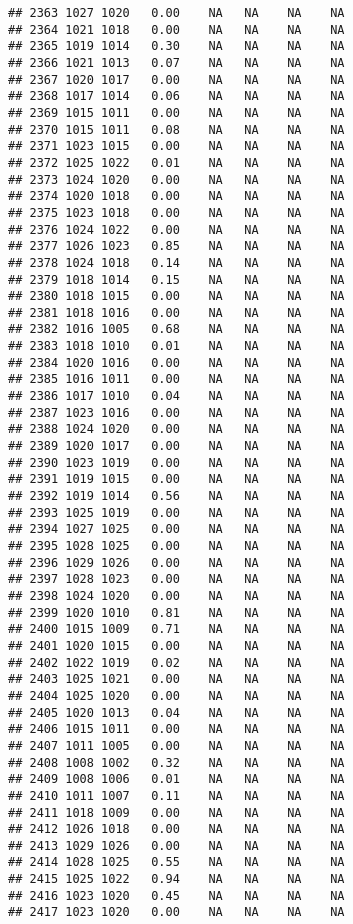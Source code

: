 \documentclass{article}\usepackage{graphicx, color}
\makeatletter
\newenvironment{kframe}{%
 \def\at@end@of@kframe{}%
 \ifinner\ifhmode%
  \def\at@end@of@kframe{\end{minipage}}%
  \begin{minipage}{\columnwidth}%
 \fi\fi%
 \def\FrameCommand##1{\hskip\@totalleftmargin \hskip-\fboxsep
 \colorbox{shadecolor}{##1}\hskip-\fboxsep
     \hskip-\linewidth \hskip-\@totalleftmargin \hskip\columnwidth}%
 \MakeFramed {\advance\hsize-\width
   \@totalleftmargin\z@ \linewidth\hsize
   \@setminipage}}%
 {\par\unskip\endMakeFramed%
 \at@end@of@kframe}
\newenvironment{knitrout}{}{} %
\makeatother
\begin{document}
\begin{knitrout}
\begin{kframe}
\begin{verbatim}
## 2363 1027 1020   0.00    NA   NA    NA    NA
## 2364 1021 1018   0.00    NA   NA    NA    NA
## 2365 1019 1014   0.30    NA   NA    NA    NA
## 2366 1021 1013   0.07    NA   NA    NA    NA
## 2367 1020 1017   0.00    NA   NA    NA    NA
## 2368 1017 1014   0.06    NA   NA    NA    NA
## 2369 1015 1011   0.00    NA   NA    NA    NA
## 2370 1015 1011   0.08    NA   NA    NA    NA
## 2371 1023 1015   0.00    NA   NA    NA    NA
## 2372 1025 1022   0.01    NA   NA    NA    NA
## 2373 1024 1020   0.00    NA   NA    NA    NA
## 2374 1020 1018   0.00    NA   NA    NA    NA
## 2375 1023 1018   0.00    NA   NA    NA    NA
## 2376 1024 1022   0.00    NA   NA    NA    NA
## 2377 1026 1023   0.85    NA   NA    NA    NA
## 2378 1024 1018   0.14    NA   NA    NA    NA
## 2379 1018 1014   0.15    NA   NA    NA    NA
## 2380 1018 1015   0.00    NA   NA    NA    NA
## 2381 1018 1016   0.00    NA   NA    NA    NA
## 2382 1016 1005   0.68    NA   NA    NA    NA
## 2383 1018 1010   0.01    NA   NA    NA    NA
## 2384 1020 1016   0.00    NA   NA    NA    NA
## 2385 1016 1011   0.00    NA   NA    NA    NA
## 2386 1017 1010   0.04    NA   NA    NA    NA
## 2387 1023 1016   0.00    NA   NA    NA    NA
## 2388 1024 1020   0.00    NA   NA    NA    NA
## 2389 1020 1017   0.00    NA   NA    NA    NA
## 2390 1023 1019   0.00    NA   NA    NA    NA
## 2391 1019 1015   0.00    NA   NA    NA    NA
## 2392 1019 1014   0.56    NA   NA    NA    NA
## 2393 1025 1019   0.00    NA   NA    NA    NA
## 2394 1027 1025   0.00    NA   NA    NA    NA
## 2395 1028 1025   0.00    NA   NA    NA    NA
## 2396 1029 1026   0.00    NA   NA    NA    NA
## 2397 1028 1023   0.00    NA   NA    NA    NA
## 2398 1024 1020   0.00    NA   NA    NA    NA
## 2399 1020 1010   0.81    NA   NA    NA    NA
## 2400 1015 1009   0.71    NA   NA    NA    NA
## 2401 1020 1015   0.00    NA   NA    NA    NA
## 2402 1022 1019   0.02    NA   NA    NA    NA
## 2403 1025 1021   0.00    NA   NA    NA    NA
## 2404 1025 1020   0.00    NA   NA    NA    NA
## 2405 1020 1013   0.04    NA   NA    NA    NA
## 2406 1015 1011   0.00    NA   NA    NA    NA
## 2407 1011 1005   0.00    NA   NA    NA    NA
## 2408 1008 1002   0.32    NA   NA    NA    NA
## 2409 1008 1006   0.01    NA   NA    NA    NA
## 2410 1011 1007   0.11    NA   NA    NA    NA
## 2411 1018 1009   0.00    NA   NA    NA    NA
## 2412 1026 1018   0.00    NA   NA    NA    NA
## 2413 1029 1026   0.00    NA   NA    NA    NA
## 2414 1028 1025   0.55    NA   NA    NA    NA
## 2415 1025 1022   0.94    NA   NA    NA    NA
## 2416 1023 1020   0.45    NA   NA    NA    NA
## 2417 1023 1020   0.00    NA   NA    NA    NA

\end{verbatim}
\end{kframe}
\end{knitrout}
\end{document}
